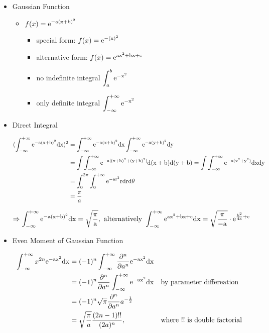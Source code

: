 \begin{itemize}
\item Gaussian Function
	\begin{itemize}
	\item $\displaystyle f(x) = \rm e^{-a(x+b)^2}$
		\begin{itemize}
		\item special form: $\displaystyle f(x) = \rm e^{-(x)^2}$
		\item alternative form: $\displaystyle f(x) = \rm e^{ax^2+bx+c}$
		\item no indefinite integral $\displaystyle \int_a^b \rm e^{-x^2}$
		\item only definite integral $\displaystyle \int_{-\infty}^{+\infty} \rm e^{-x^2}$
		\end{itemize}
	\end{itemize}
\item Direct Integral
	\begin{itemize}
	\Item \begin{align*}\displaystyle (\int^{+\infty}_{-\infty} \rm e^{-a(x+b)^2}dx)^2 &= \int^{+\infty}_{-\infty} \rm e^{-a(x+b)^2}dx\int^{+\infty}_{-\infty} \rm e^{-a(y+b)^2}dy \\ &= \int\int^{+\infty}_{-\infty} \rm e^{-a[(x+b)^2  + (y+b)^2]}d(x+b)d(y+b) = \int\int^{+\infty}_{-\infty} \rm e^{-a(x^2+y^2)}dxdy \\ &= \int_0^{2\pi}\int_0^{+\infty} \rm e^{-ar^2}rdrd\theta  \\ &= \frac \pi a \end{align*}
	
	$\displaystyle \Rightarrow \int^{+\infty}_{-\infty} \rm e^{-a(x+b)^2}dx = \sqrt{\frac \pi a}, \text{ alternatively } \int^{+\infty}_{-\infty} \rm e^{ax^2+bx+c}dx = \sqrt{\frac {\pi} {-a}} \cdot \rm e^{\frac {b^2}{4a} + c}$
	\end{itemize}

\item Even Moment of Gaussian Function
	\begin{itemize}
	\Item \begin{align*} \displaystyle \int_{-\infty}^{+\infty} x^{2n}\rm{e}^{-ax^2}dx &= (-1)^n\int^{+\infty}_{-\infty} \frac {\partial^n} {\partial a^n} \rm{e}^{-ax^2}dx \\ &= (-1)^n \frac {\partial^n} {\partial a^n} \int_{-\infty}^{+\infty} \rm{e}^{-ax^2}dx && \text{by parameter differeation} \\ &= (-1)^n\sqrt{\pi} \frac {\partial^n} {\partial a^n} a^{-\frac 12} \\ &= \sqrt {\frac {\pi}{a}} \frac {(2n-1)!!}{(2a)^n}, &&\text{where } !! \text{ is double factorial} \end{align*}
	\end{itemize}
\end{itemize}

